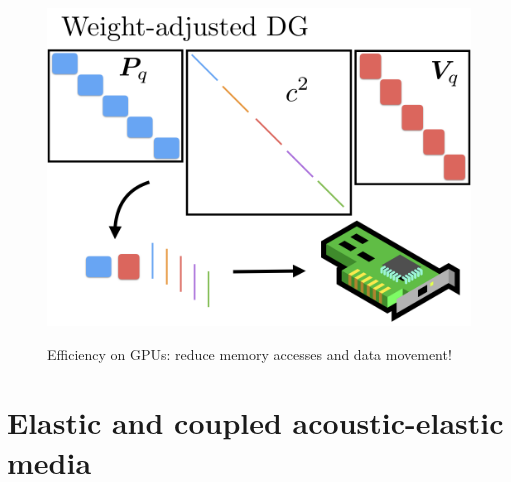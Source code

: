 \documentclass[compress]{beamer}
\begin{document}
{{\begin{figure}
{}%
{%
\includegraphics[width=.75\textwidth]{wadg_gpu2.png}
}%
\caption*{Efficiency on GPUs: reduce memory accesses and data movement!}
\end{figure}
}

}

\section{Elastic and coupled acoustic-elastic media}
\end{document}
